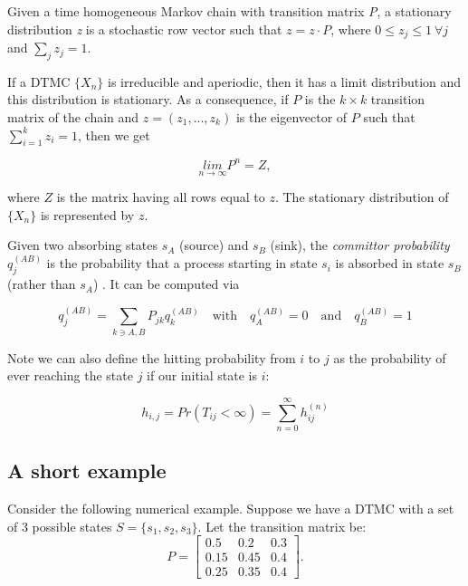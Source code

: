 \documentclass[
  nojss]{jss}
\begin{document}
Given a time homogeneous Markov chain with transition matrix \emph{P}, a stationary distribution \emph{z} is a stochastic row vector such that \(z=z\cdot P\), where \(0\leq z_{j}\leq 1 \: \forall j\) and \(\sum_{j}z_{j}=1\).

If a DTMC \(\{X_{n}\}\) is irreducible and aperiodic, then it has a limit distribution and this distribution is stationary. As a consequence, if \(P\) is the \(k\times k\) transition matrix of the chain and \(z=\left(z_{1},...,z_{k}\right)\) is the eigenvector of \(P\) such that \(\sum_{i=1}^{k}z_{i}=1\), then we get

\begin{equation}
  \underset{n\rightarrow\infty}{lim}P^{n}=Z,
  \label{eq:limMc}
\end{equation}

where \(Z\) is the matrix having all rows equal to \(z\). The stationary distribution of \(\{X_{n}\}\) is represented by \(z\).

Given two absorbing states \(s_A\) (source) and \(s_B\) (sink), the \emph{committor probability} \(q_j^{(AB)}\) is the probability that a process starting in state \(s_i\) is absorbed in state \(s_B\) (rather than \(s_A\)) \citep{noe_constructing_2009}. It can be computed via

\begin{equation}
 q_j^{(AB)} = \sum_{k \ni {A, B}} P_{jk}q_k^{(AB)} \quad \mbox{with} \quad
 q_A^{(AB)} = 0 \quad \mbox{and} \quad  q_B^{(AB)} = 1
\end{equation}

Note we can also define the hitting probability from \(i\) to \(j\) as the probability of ever reaching the state \(j\) if our initial state is \(i\):

\begin{equation}
h_{i,j} = Pr(T_{ij} < \infty) = \sum_{n = 0}^{\infty} h_{ij}^{(n)}
\label{eq:hitting-probs}
\end{equation}

\hypertarget{a-short-example}{%
\subsection{A short example}\label{a-short-example}}

Consider the following numerical example. Suppose we have a DTMC with a set of 3 possible states \(S=\{s_{1}, s_{2}, s_{3}\}\). Let the transition matrix be:
\begin{equation}
P=\left[\begin{array}{ccc}
0.5 & 0.2 & 0.3\\
0.15 & 0.45 & 0.4\\
0.25 & 0.35 & 0.4
\end{array}\right].
\label{eq:trPropExEx1}
\end{equation}
\end{document}
